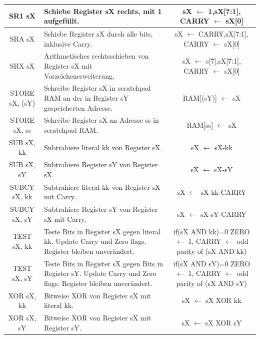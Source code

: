 \documentclass[bibliography=totoc,listof=totoc,index=totoc]{scrartcl}
\begin{document}
\begin{small}
\begin{longtable}{||c|p{6.5cm}|c||}
         SR1 sX & Schiebe Register sX rechts, mit 1 aufgefüllt. &sX $\leftarrow$ {1,sX[7:1]}, CARRY $\leftarrow$ sX[0]  \\ \hline
         SRA sX & Schiebe Register sX durch alle bits, inklusive Carry. &sX $\leftarrow$ {CARRY,sX[7:1]}, CARRY $\leftarrow$ sX[0]  \\ \hline
         SRX sX & Arithmetisches rechtsschieben von Register sX mit Vorzeichenerweiterung. &sX $\leftarrow$ {s[7],sX[7:1]}, CARRY $\leftarrow$ sX[0]  \\ \hline
         STORE sX, (sY) & Schreibe Register sX in scratchpad RAM an der in Register sY gespeicherten Adresse. &RAM[(sY)] $\leftarrow$ sX \\ \hline
         STORE sX, ss & Schreibe Register sX an Adresse ss in scratchpad RAM. &RAM[ss] $\leftarrow$ sX \\ \hline
         SUB sX, kk & Subtrahiere literal kk von Register sX. &sX $\leftarrow$ sX-kk  \\ \hline
         SUB sX, sY & Subtrahiere Register sY von Register sX. &sX $\leftarrow$ sX-sY  \\ \hline
         SUBCY sX, kk & Subtrahiere literal kk von Register sX mit Carry. &sX $\leftarrow$ sX-kk-CARRY  \\ \hline
         SUBCY sX, sY & Subtrahiere Register sY von Register sX mit Carry. &sX $\leftarrow$ sX-sY-CARRY  \\ \hline
         TEST sX, kk & Teste Bits in Register sX gegen literal kk. Update Carry und Zero flags. Register bleiben unverändert. & \makecell{if(sX AND kk)=0 ZERO $\leftarrow$ 1, \\ CARRY $\leftarrow$ odd parity of (sX AND kk) }   \\ \hline
         TEST sX, sY  & Teste Bits in Register sX gegen Bits in Register sY. Update Carry und Zero flags. Register bleiben unverändert. & \makecell{if(sX AND sY)=0 ZERO $\leftarrow$ 1, \\ CARRY $\leftarrow$ odd parity of (sX AND sY) }  \\ \hline
         XOR sX, kk & Bitweise XOR von Register sX mit literal kk. &sX $\leftarrow$ sX XOR kk  \\ \hline
         XOR sX, sY & Bitweise XOR von Register sX mit Register sY. &sX $\leftarrow$ sX XOR sY   \\ \hline
    
    \end{longtable}



\end{small}
\end{document}

